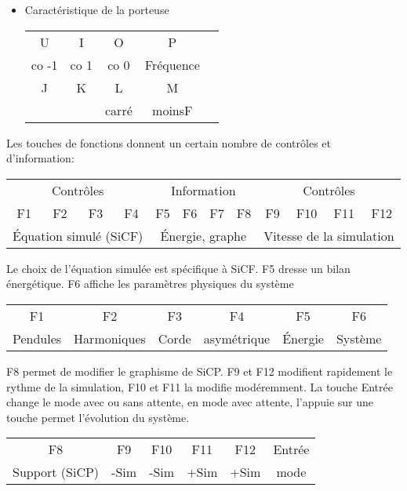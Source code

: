 \begin{itemize}[leftmargin=2cm, label=, itemsep=0pt]%
\item Caractéristique de la porteuse

\hspace{9cm}
\begin{tabular}{ccccc}
\sf U &\sf I &\sf O &\sf P \\
 co -1 & co 1 & co 0 & Fréquence \\
\sf J &\sf K &\sf L &\sf M \\
  &  & carré & moinsF \\
\end{tabular}
%
\end{itemize}
Les touches de fonctions donnent un certain nombre de contrôles et d'information:
%
\begin{center}
\begin{tabular}{ccccc ccccc cc}
\multicolumn{4}{|c|}{Contrôles} & \multicolumn{4}{c}{Information} & \multicolumn{4}{|c|}{Contrôles}\\
\sf F1 &\sf F2 &\sf F3 &\sf F4 &\sf F5 &\sf F6 &\sf F7 &\sf F8 &\sf F9 &\sf F10 &\sf F11 &\sf F12 \\
\multicolumn{4}{|c|}{Équation simulé (SiCF)} & \multicolumn{4}{c}{Énergie, graphe} & \multicolumn{4}{|c|}{Vitesse de la simulation}\\
\end{tabular}
\end{center}
%
Le choix de l'équation simulée est spécifique à SiCF. {\sf F5} dresse un bilan énergétique. {\sf F6} affiche les paramètres physiques du système
\begin{center}
\begin{tabular}{cccccc}
\sf F1 &\sf F2 &\sf F3 &\sf F4 &\sf F5 &\sf F6\\
Pendules & Harmoniques & Corde & asymétrique & Énergie & Système \\
\end{tabular}
\end{center}
%
{\sf F8} permet de modifier  le graphisme de SiCP. {\sf F9} et {\sf F12} modifient rapidement le rythme de la simulation, {\sf F10} et {\sf F11} la modifie modéremment. La touche {\sf Entrée} change le mode avec ou sans attente, en mode avec attente, l'appuie sur une touche permet l'évolution du système.
\begin{center}
\begin{tabular}{cccccc}
\sf F8 &\sf F9 &\sf F10 &\sf F11 &\sf F12 & \sf Entrée \\
Support (SiCP) & -Sim & -Sim & +Sim & +Sim & mode\\
\end{tabular}
\end{center}
%
%
